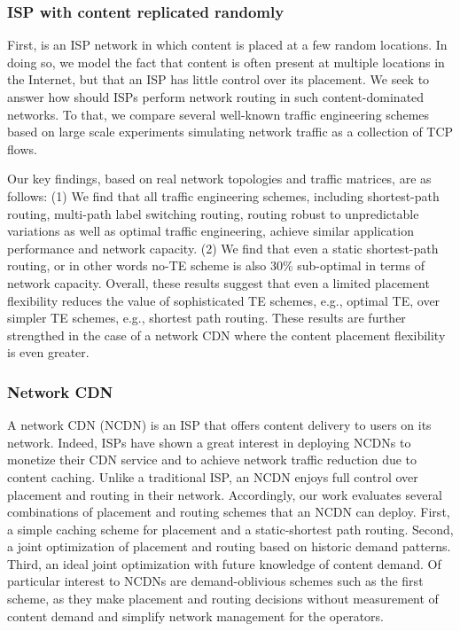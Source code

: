 \subsubsection{ISP with content replicated randomly}
First, is an ISP network in which content is placed at a few random locations. In doing so, we model the fact that content is often present at multiple locations in the Internet, but that an ISP has little control over its placement. We seek to answer how should ISPs perform network routing in such content-dominated networks. To that, we compare several well-known traffic engineering schemes based on large scale experiments simulating network traffic as a collection of TCP flows. 

Our key findings, based on real network topologies and traffic matrices, are as follows: (1) We find that all traffic engineering schemes, including shortest-path routing, multi-path label switching routing, routing robust to unpredictable variations as well as optimal traffic engineering, achieve similar application performance and network capacity.   (2) We find that even a static shortest-path routing, or in other words no-TE scheme is also 30\% sub-optimal in terms of network capacity. Overall, these results suggest that even a limited placement flexibility reduces the value of sophisticated TE schemes, e.g., optimal TE, over simpler TE schemes, e.g., shortest path routing. These results are further strengthed in the case of a network CDN where the content placement flexibility is even greater.

\subsubsection{Network CDN}
A network CDN (NCDN) is an ISP that offers content delivery to users on its network. Indeed, ISPs have shown a great interest in deploying NCDNs to monetize their CDN service and to achieve network traffic reduction due to content caching. Unlike a traditional ISP, an NCDN enjoys full control over placement and routing in their network. Accordingly, our work evaluates several combinations of placement and routing schemes that an NCDN can deploy. First, a simple caching scheme for placement and a static-shortest path routing. Second, a joint optimization of placement and routing based on historic demand patterns. Third,  an ideal joint optimization with future knowledge of content demand.  Of particular interest to NCDNs are demand-oblivious schemes such as the first scheme, as they make placement and routing decisions without measurement of content demand and simplify network management for the operators. 

